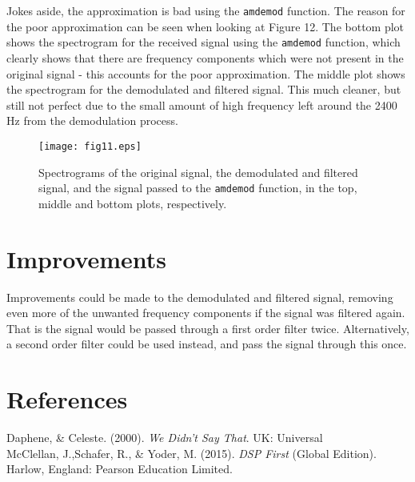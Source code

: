 \documentclass{article}
\begin{document}
Jokes aside, the approximation is bad using the \verb|amdemod| function. The reason for the poor approximation can be seen when looking at Figure 12. The bottom plot shows the spectrogram for the received signal using the \verb|amdemod| function, which clearly shows that there are frequency components which were not present in the original signal - this accounts for the poor approximation. The middle plot shows the spectrogram for the demodulated and filtered signal. This much cleaner, but still not perfect due to the small amount of high frequency left around the 2400 $\si{\hertz}$ from the demodulation process.

\begin{figure}[H]
	\centering
	\texttt{[image: fig11.eps]}
	\cprotect\caption{Spectrograms of the original signal, the demodulated and filtered signal, and the signal passed to the \verb|amdemod| function, in the top, middle and bottom plots, respectively.}
\end{figure}


\section{Improvements}

Improvements could be made to the demodulated and filtered signal, removing even more of the unwanted frequency components if the signal was filtered again. That is the signal would be passed through a first order filter twice. Alternatively, a second order filter could be used instead, and pass the signal through this once.


\section{References}

Daphene, \& Celeste. (2000). \textit{We Didn't Say That}. UK: Universal\\

McClellan, J.,Schafer, R., \& Yoder, M. (2015). \textit{DSP First} (Global Edition). Harlow, England: Pearson Education Limited.
\end{document}
